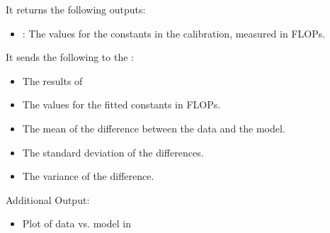 It returns the following outputs:

\begin{itemize}
\item {}: The values for the constants in the calibration, measured in FLOPs.
\end{itemize}

It sends the following to the :

\begin{itemize}
\item The results of 
\item The values for the fitted constants in FLOPs.
\item The mean of the difference between the data and the model.
\item The standard deviation of the differences.
\item The variance of the difference.
\end{itemize}

Additional Output:
\begin{itemize}
\item Plot of data vs. model in 
\end{itemize}
